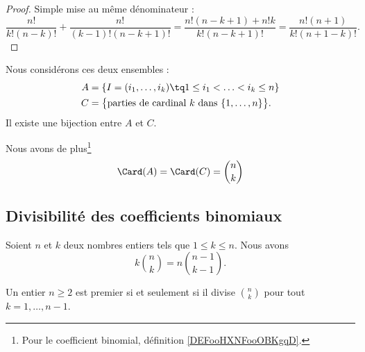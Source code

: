 \begin{proof}
	Simple mise au même dénominateur :
	\begin{equation}
		\frac{ n! }{ k!(n-k)! }+\frac{ n! }{ (k-1)!(n-k+1)! }=\frac{ n!(n-k+1)+n!k }{ k!(n-k+1)! }=\frac{ n!(n+1) }{  k!(n+1-k)!  }.
	\end{equation}
\end{proof}

\begin{lemma}		\label{LEMooUTDTooXAmvdF}
	Nous considérons ces deux ensembles :
	\begin{subequations}
		\begin{align}
			A & =\{ I=(i_1,\ldots,i_k)\tq 1\leq i_1<\ldots <i_k\leq n \}                     \\
			C & =\big\{ \text{parties de cardinal \( k\) dans \( \{ 1,\ldots,n \}\)} \big\}.
		\end{align}
	\end{subequations}
	Il existe une bijection entre \( A\) et \( C\).

	Nous avons de plus\footnote{Pour le coefficient binomial, définition \ref{DEFooHXNFooOBKgqD}.}
	\begin{equation}        \label{EQooSPVNooHoPnOe}
		\Card(A)=\Card(C)={n\choose k}
	\end{equation}
\end{lemma}


\subsection{Divisibilité des coefficients binomiaux}

\begin{lemma}	\label{LEMooYBOIooEtVfDQ}
	Soient \( n\) et \( k\) deux nombres entiers tels que \( 1\leq k\leq n\). Nous avons
	\begin{equation}		\label{EQooDNBYooZfJEAe}
		k\binom{ n }{ k }=n\binom{ n-1 }{ k-1 }.
	\end{equation}
\end{lemma}

\begin{proposition}	\label{PROPooVPOYooNNugWU}
	Un entier \( n\geq 2\) est premier si et seulement si il divise \( \binom{ n }{ k }\) pour tout \( k=1,\ldots,n-1\).
\end{proposition}

